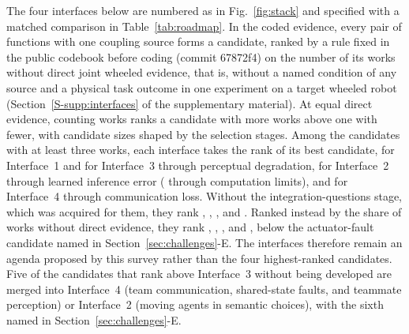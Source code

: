 The four interfaces below are numbered as in Fig.~\ref{fig:stack} and specified with a matched comparison in Table~\ref{tab:roadmap}. In the coded evidence, every pair of functions with one coupling source forms a candidate, ranked by a rule fixed in the public codebook before coding (commit 67872f4) on the number of its works without direct joint wheeled evidence, that is, without a named condition of any source and a physical task outcome in one experiment on a target wheeled robot (Section~\ref{S-supp:interfaces} of the supplementary material). At equal direct evidence, counting works ranks a candidate with more works above one with fewer, with candidate sizes shaped by the selection stages. Among the \CandidateCount{} candidates with at least three works, each interface takes the rank of its best candidate, \IfaceOneRank{} for Interface~1 and \IfaceThreeRank{} for Interface~3 through perceptual degradation, \IfaceTwoRank{} for Interface~2 through learned inference error (\IfaceTwoResRank{} through computation limits), and \IfaceFourRank{} for Interface~4 through communication loss. Without the integration-questions stage, which was acquired for them, they rank \IfaceOneRankA{}, \IfaceTwoRankA{}, \IfaceThreeRankA{}, and \IfaceFourRankA{}. Ranked instead by the share of works without direct evidence, they rank \IfaceOneRankB{}, \IfaceTwoRankB{}, \IfaceThreeRankB{}, and \IfaceFourRankB{}, below the actuator-fault candidate named in Section~\ref{sec:challenges}-E. The interfaces therefore remain an agenda proposed by this survey rather than the four highest-ranked candidates. Five of the \RejectedCount{} candidates that rank above Interface~3 without being developed are merged into Interface~4 (team communication, shared-state faults, and teammate perception) or Interface~2 (moving agents in semantic choices), with the sixth named in Section~\ref{sec:challenges}-E.

